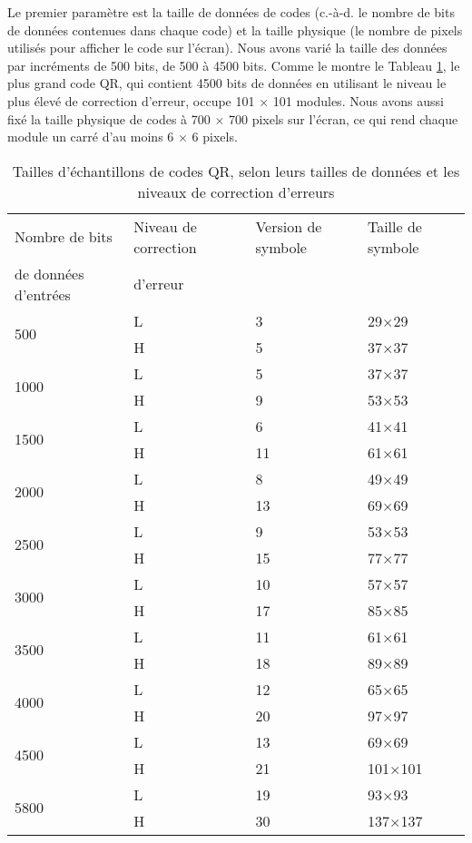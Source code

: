 Le premier paramètre est la taille de données de codes (c.-à-d. le nombre de bits de données contenues dans chaque code) et la taille physique (le nombre de pixels utilisés pour afficher le code sur l'écran). Nous avons varié la taille des données par incréments de 500 bits, de 500 à 4500 bits. Comme le montre le Tableau \ref{tab:qr:sample-sizes}, le plus grand code QR, qui contient 4500 bits de données en utilisant le niveau le plus élevé de correction d'erreur, occupe 101 $\times$ 101 modules. Nous avons aussi fixé la taille physique de codes à 700 $\times$ 700 pixels sur l'écran, ce qui rend chaque module un carré d'au moins 6 $\times$ 6 pixels.

\begin{table}[ht]
\begin{center}
\begin{tabular}{llll}
Nombre de bits & Niveau de correction & Version de symbole & Taille de symbole \\
de données d'entrées & d'erreur & & \\
\hline
\multirow{2}{*}{500} & L & 3 & 29$\times$29\\
& H & 5 & 37$\times$37\\
\hline
\multirow{2}{*}{1000} & L & 5 & 37$\times$37\\
& H & 9 & 53$\times$53\\
\hline
\multirow{2}{*}{1500} & L & 6 & 41$\times$41\\
& H & 11 & 61$\times$61\\
\hline
\multirow{2}{*}{2000} & L & 8 & 49$\times$49\\
& H & 13 & 69$\times$69\\
\hline
\multirow{2}{*}{2500} & L & 9 & 53$\times$53\\
& H & 15 & 77$\times$77\\
\hline
\multirow{2}{*}{3000} & L & 10 & 57$\times$57\\
& H & 17 & 85$\times$85\\
\hline
\multirow{2}{*}{3500} & L & 11 & 61$\times$61\\
& H & 18 & 89$\times$89\\
\hline
\multirow{2}{*}{4000} & L & 12 & 65$\times$65\\
& H & 20 & 97$\times$97\\
\hline
\multirow{2}{*}{4500} & L & 13 & 69$\times$69\\
& H & 21 & 101$\times$101\\
\hline
\multirow{2}{*}{5800} & L & 19 & 93$\times$93\\
& H & 30 & 137$\times$137\\
\hline\end{tabular}
\caption[Tailles d'échantillons]{Tailles d'échantillons de codes QR, selon leurs tailles de données et les niveaux de correction d'erreurs \citep{iso18004}}
\label{tab:qr:sample-sizes}
\end{center}
\end{table}

